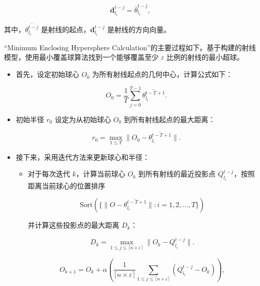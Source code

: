 \documentclass[lettersize,journal]{IEEEtran}
\begin{document}
\begin{enumerate}
\begin{itemize}
    \begin{equation}
    \mathbf{d}_{l_i}^{t-j} = \bar{\theta}_{l_i}^{t-j},
    \end{equation}

    其中，\( \overline{\theta_{l_i}^{t-j}} \) 是射线的起点，\( \mathbf{d}_{l_i}^{t-j} \) 是射线的方向向量。
\end{itemize}

“Minimum Enclosing Hypersphere Calculation”的主要过程如下。基于构建的射线模型，使用最小覆盖球算法找到一个能够覆盖至少 \( \varepsilon \) 比例的射线的最小超球。

\begin{itemize}
    \item 首先，设定初始球心 \( O_0 \) 为所有射线起点的几何中心，计算公式如下：

    \begin{equation}
    O_0 = \frac{1}{T} \sum_{j=0}^{T-1} \overline{\theta_{l_i}^{t-T+1}}.
    \end{equation}

    \item 初始半径 \( r_0 \) 设定为从初始球心 \( O_0 \) 到所有射线起点的最大距离：

    \begin{equation}
    r_0 = \max_{1\leq T} \|O_0 - \overline{\theta_{l_i}^{t-T+1}}\|.
    \end{equation}

    \item 接下来，采用迭代方法来更新球心和半径：
    \begin{itemize}
       \item 对于每次迭代 \( k \)，计算当前球心 \( O_k \) 到所有射线的最近投影点 \( Q_{l_i}^{t-j} \)，按照距离当前球心的位置排序

        \begin{equation}
        \text{Sort}(\{ \| O - \overline{\theta_{l_i}^{t-T+1}} \| : i = 1, 2, \ldots, T \})
        \end{equation}

        并计算这些投影点的最大距离 \( D_k \)：

        \begin{equation}
        D_k = \max_{1\leq j\leq \lceil n\times \varepsilon\rceil} \|O_k - Q_{l_i}^{t-j}\|.
        \end{equation}

        \begin{equation}
        O_{k+1} = O_k + \alpha \left(\frac{1}{\lceil n\times \varepsilon\rceil} \sum_{1\leq j\leq \lceil n\times \varepsilon\rceil} (Q_{l_i}^{t-j} - O_k)\right),
        \end{equation}


\end{itemize}
\end{itemize}
\end{enumerate}
\end{document}
